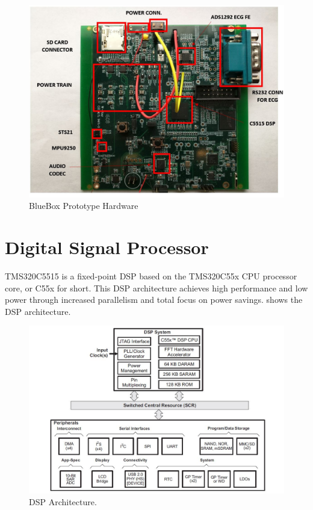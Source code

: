 \begin{figure}
	\centering
	\includegraphics[scale = 0.5]{BlueBox_Hardware}
	\caption{BlueBox Prototype Hardware \label{BlueBox_Hardware}}
	\label{fig:bbHardware}
\end{figure} 

\section{Digital Signal Processor}

TMS320C5515 is a fixed-point DSP based on the TMS320C55x CPU
processor core, or C55x for short.  This DSP architecture achieves
high performance and low power through increased parallelism and
total focus on power savings.  shows the DSP
architecture.

\begin{figure}
	\centering
	\includegraphics[scale = 0.75 ]{C5515_arch}
	\caption{DSP Architecture. \cite{tms320c5515}
	\label{C5515 Architecture}}
\end{figure} 

